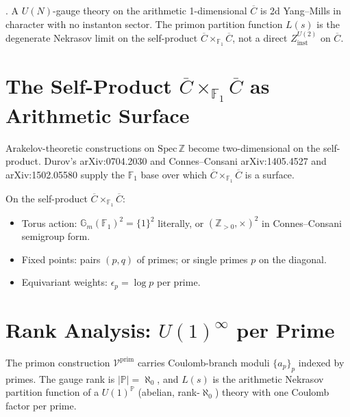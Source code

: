 \begin{corollary}
\label{v4-arith:cor:no-direct-Z-inst}
\ClaimStatusProvedHere. A \(U(N)\)-gauge theory on the arithmetic
1-dimensional \(\overline{C}\) is 2d Yang--Mills in character with
no instanton sector. The primon partition function \(L(s)\) is the
degenerate Nekrasov limit on the self-product
\(\overline{C}\times_{\mathbb{F}_{1}}\overline{C}\), not a direct
\(Z^{U(2)}_{\mathrm{inst}}\) on \(\overline{C}\).
\end{corollary}

\section{The Self-Product \(\overline{C}\times_{\mathbb{F}_{1}}\overline{C}\) as Arithmetic Surface}
\label{v4-arith:nk:arithmetic-surface}

\begin{principle}[Deligne]
\label{v4-arith:princ:deligne-self-product}
Arakelov-theoretic constructions on \(\mathrm{Spec}\,\mathbb{Z}\)
become two-dimensional on the self-product. Durov's arXiv:0704.2030
and Connes--Consani arXiv:1405.4527 and arXiv:1502.05580 supply the \(\mathbb{F}_{1}\)
base over which \(\overline{C}\times_{\mathbb{F}_{1}}\overline{C}\)
is a surface.
\end{principle}

\begin{definition}
\label{v4-arith:def:arithmetic-surface-setup}
On the self-product \(\overline{C}\times_{\mathbb{F}_{1}}\overline{C}\):
\begin{itemize}
\item Torus action: \(\mathbb{G}_{m}(\mathbb{F}_{1})^{2}=\{1\}^{2}\)
literally, or \((\mathbb{Z}_{>0},\times)^{2}\) in Connes--Consani
semigroup form.
\item Fixed points: pairs \((p,q)\) of primes; or single primes \(p\)
on the diagonal.
\item Equivariant weights: \(\epsilon_{p}=\log p\) per prime.
\end{itemize}
\end{definition}

\section{Rank Analysis: \(U(1)^{\infty}\) per Prime}
\label{v4-arith:nk:rank-analysis}

\begin{observation}
\label{v4-arith:obs:rank-infinite}
The primon construction \(\mathcal{V}^{\mathrm{prim}}\) carries Coulomb-branch moduli \(\{a_{p}\}_{p}\) indexed by
primes. The gauge rank is \(|\mathbb{P}|=\aleph_{0}\), and
\(L(s)\) is the arithmetic Nekrasov partition function of a
\(U(1)^{\mathbb{P}}\) (abelian, rank-\(\aleph_{0}\)) theory with
one Coulomb factor per prime.
\end{observation}

